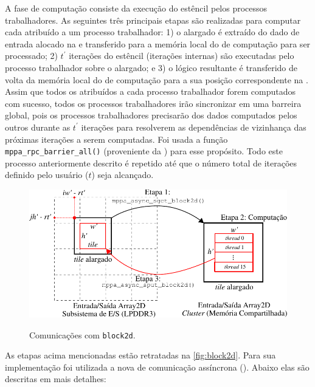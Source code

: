 A fase de computação consiste da execução do  estêncil pelos processos trabalhadores. As seguintes três principais etapas são realizadas para computar cada \tile atribuído a um processo trabalhador: 1) o \tile alargado é extraído do dado de entrada alocado na \lpddr e transferido para a memória local do \cluster de computação para ser processado; 2) $t^\prime$ iterações do  estêncil (iterações internas) são executadas pelo processo trabalhador sobre o \tile alargado; e 3) o \tile lógico resultante é transferido de volta da memória local do \cluster de computação para a sua posição correspondente na \lpddr. Assim que todos os \tiles atribuídos a cada processo trabalhador forem computados com sucesso, todos os processos trabalhadores irão sincronizar em uma barreira global, pois os processos trabalhadores precisarão dos dados computados pelos outros durante as $t^\prime$ iterações para resolverem as dependências de vizinhança das próximas iterações a serem computadas. 
Foi usada a função \texttt{mppa\_rpc\_barrier\_all()} (proveniente da \api \async) para esse propósito. Todo este processo anteriormente descrito é repetido até que o número total de iterações definido pelo usuário ($t$) seja alcançado.

\begin{figure}[t]
	\centering
	\caption{Comunicações com \texttt{block2d}.}
	\includegraphics[width=1\textwidth]{figs/pskel-mppa-fluxogram.pdf} \\
  \label{fig:block2d}
\end{figure}

As etapas acima mencionadas estão retratadas na \autoref{fig:block2d}. Para sua implementação foi utilizada a nova \api de comunicação assíncrona (\async). Abaixo elas são descritas em mais detalhes:

